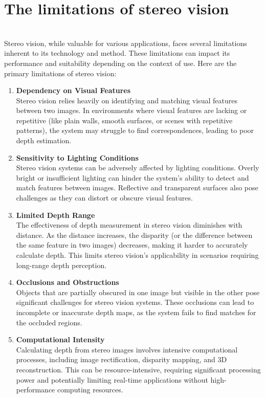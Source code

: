 \documentclass[22pt]{report}
\begin{document}
    \section{The limitations of stereo vision}\\
        Stereo vision, while valuable for various applications, faces several limitations inherent to its technology and method. These limitations can impact its performance and suitability depending on the context of use. Here are the primary limitations of stereo vision:
        \begin{enumerate}
            \item \textbf{Dependency on Visual Features}\\
                Stereo vision relies heavily on identifying and matching visual features between two images. In environments where visual features are lacking or repetitive (like plain walls, smooth surfaces, or scenes with repetitive patterns), the system may struggle to find correspondences, leading to poor depth estimation.
            \item \textbf{Sensitivity to Lighting Conditions}\\
                Stereo vision systems can be adversely affected by lighting conditions. Overly bright or insufficient lighting can hinder the system's ability to detect and match features between images. Reflective and transparent surfaces also pose challenges as they can distort or obscure visual features.
            \item \textbf{Limited Depth Range}\\
                The effectiveness of depth measurement in stereo vision diminishes with distance. As the distance increases, the disparity (or the difference between the same feature in two images) decreases, making it harder to accurately calculate depth. This limits stereo vision's applicability in scenarios requiring long-range depth perception.
            \item \textbf{Occlusions and Obstructions}\\
                Objects that are partially obscured in one image but visible in the other pose significant challenges for stereo vision systems. These occlusions can lead to incomplete or inaccurate depth maps, as the system fails to find matches for the occluded regions.
            \item \textbf{Computational Intensity}\\
                Calculating depth from stereo images involves intensive computational processes, including image rectification, disparity mapping, and 3D reconstruction. This can be resource-intensive, requiring significant processing power and potentially limiting real-time applications without high-performance computing resources.

\end{enumerate}
\end{document}
